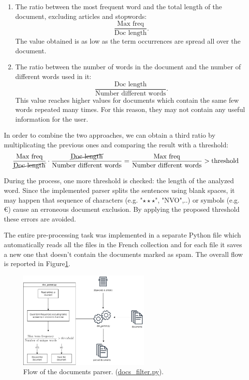 \begin{enumerate}
    \item The ratio between the most frequent word and the total length of the document, excluding articles and stopwords: 
    \begin{equation}
        \frac{\text{Max freq}}{\text{Doc length}}.
    \end{equation} 
    The value obtained is as low as the term occurrences are spread all over the document.
    \item The ratio between the number of words in the document and the number of different words used in it:
    \begin{equation}
        \frac{\text{Doc length}}{\text{Number different words}}.
    \end{equation} This value reaches higher values for documents which contain the same few words repeated many times. For this reason, they may not contain any useful information for the user.  
\end{enumerate}
In order to combine the two approaches, we can obtain a third ratio by multiplicating the previous ones and comparing the result with a threshold:
\begin{equation}
    \frac{\text{Max freq}}{\cancel{\text{Doc length}}} \cdot \frac{\cancel{\text{Doc length}}}{\text{Number different words}} = \frac{\text{Max freq}}{\text{Number different words}} > \text{threshold}
\end{equation}
\par
During the process, one more threshold is checked: the length of the analyzed word. Since the implemented parser splits the sentences using blank spaces, it may happen that sequence of characters (e.g. "$\star \star \star$", "NVO",..) or symbols (e.g. €) cause an erroneous document exclusion. By applying the proposed threshold these errors are avoided. 
\par
The entire pre-processing task was implemented in a separate Python file which automatically reads all the files in the French collection and for each file it saves a new one that doesn't contain the documents marked as spam. The overall flow is reported in Figure\ref{fig:doc_parser-figure}. 

\begin{figure}
  \centering
  \includegraphics[width=250px,scale=0.5]{figure/doc_parser-diagram.png}
  \caption{Flow of the documents parser. (\href{https://bitbucket.org/upd-dei-stud-prj/seupd2223-dards/src/french/docs_filter.py}{docs\_filter.py}).}
  \label{fig:doc_parser-figure}
\end{figure}

